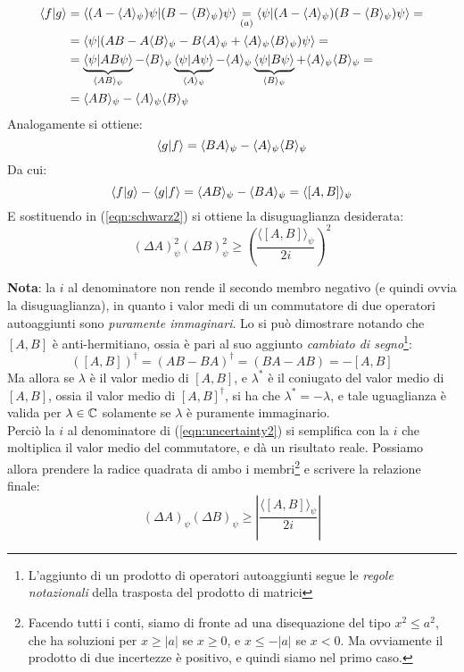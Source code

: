\documentclass[../../FisicaTeorica.tex]{subfiles}
\begin{document}
\begin{expl}
\begin{align*}
\braket{f|g}&=\braket{(A-\langle A\rangle_\psi)\psi | (B-\langle B \rangle_\psi)\psi} \underset{(a)}{=} \braket{\psi | (A-\langle A \rangle_\psi)(B- \langle B \rangle_\psi)\psi} =\\
&=\braket{\psi | (AB - A\langle B \rangle_\psi - B\langle A \rangle_\psi + \langle A \rangle_\psi \langle B \rangle_\psi)\psi} =\\
&= \underbrace{\braket{\psi|AB\psi}}_{\langle AB\rangle_\psi} - \langle B \rangle_\psi \underbrace{\braket{\psi|A\psi}}_{\langle A \rangle_\psi} -\langle A \rangle_\psi \underbrace{\braket{\psi|B\psi}}_{\langle B \rangle_\psi} + \langle A \rangle_\psi \langle B \rangle_\psi =\\
&= \langle A B\rangle_\psi - \langle A\rangle_\psi \langle B \rangle_\psi
\end{align*}
Analogamente si ottiene:
\[
\braket{g|f} =\langle B A \rangle_\psi - \langle A \rangle_\psi \langle B \rangle_\psi
\]
Da cui:
\[
\braket{f|g}-\braket{g|f}=\langle AB\rangle_\psi - \langle BA\rangle_\psi=\langle [A,B]\rangle_\psi
\]
E sostituendo in (\ref{eqn:schwarz2}) si ottiene la disuguaglianza desiderata:
\begin{equation}
(\Delta A)^2_\psi (\Delta B)^2_\psi \geq \left(\frac{\langle [A,B]\rangle_\psi}{2i} \right)^2
\label{eqn:uncertainty2}
\end{equation}

\textbf{Nota}: la $i$ al denominatore non rende il secondo membro negativo (e quindi ovvia la disuguaglianza), in quanto i valor medi di un commutatore di due operatori autoaggiunti sono \textit{puramente immaginari}. Lo si può dimostrare notando che $[A,B]$ è anti-hermitiano, ossia è pari al suo aggiunto \textit{cambiato di segno}\footnote{L'aggiunto di un prodotto di operatori autoaggiunti segue le \textit{regole notazionali} della trasposta del prodotto di matrici}:
\[
([A,B])^\dag = (AB-BA)^\dag =(BA-AB)=-[A,B]
\]
Ma allora se $\lambda$ è il valor medio di $[A,B]$, e $\lambda^*$ è il coniugato del valor medio di $[A,B]$, ossia il valor medio di $[A,B]^\dag$, si ha che $\lambda^* = -\lambda$, e tale uguaglianza è valida per $\lambda \in \mathbb{C}$ solamente se $\lambda$ è puramente immaginario.\\
Perciò la $i$ al denominatore di (\ref{eqn:uncertainty2}) si semplifica con la $i$ che moltiplica il valor medio del commutatore, e dà un risultato reale. Possiamo allora prendere la radice quadrata di ambo i membri\footnote{Facendo tutti i conti, siamo di fronte ad una disequazione del tipo $x^2 \leq a^2$, che ha soluzioni per $x\geq |a|$ se $x\geq 0$, e $x\leq -|a|$ se $x< 0$. Ma ovviamente il prodotto di due incertezze è positivo, e quindi siamo nel primo caso.} e scrivere la relazione finale:
\[
(\Delta A)_\psi (\Delta B)_\psi \geq \left|\frac{\langle [A,B]\rangle_\psi}{2i}\right|
\]
\end{expl}
\end{document}

